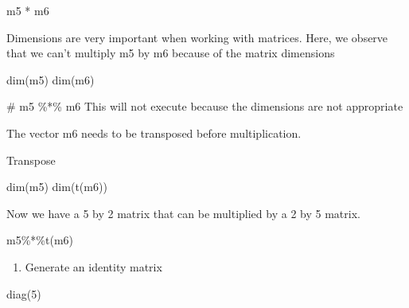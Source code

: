 \documentclass[
  letterpaper,
  DIV=11,
  numbers=noendperiod]{scrreprt}
\newenvironment{Shaded}{}{}
\newcommand{\CommentTok}[1]{\textcolor[rgb]{0.42,0.45,0.49}{#1}}
\newcommand{\DecValTok}[1]{\textcolor[rgb]{0.00,0.36,0.77}{#1}}
\newcommand{\FunctionTok}[1]{\textcolor[rgb]{0.44,0.26,0.76}{#1}}
\newcommand{\NormalTok}[1]{\textcolor[rgb]{0.14,0.16,0.18}{#1}}
\newcommand{\SpecialCharTok}[1]{\textcolor[rgb]{0.00,0.36,0.77}{#1}}
\providecommand{\tightlist}{%
  \setlength{\itemsep}{0pt}\setlength{\parskip}{0pt}}\usepackage{longtable,booktabs,array}
\begin{document}
\begin{Shaded}
\begin{Highlighting}[]
\NormalTok{m5 }\SpecialCharTok{*}\NormalTok{ m6}
\end{Highlighting}
\end{Shaded}

Dimensions are very important when working with matrices. Here, we
observe that we can't multiply m5 by m6 because of the matrix dimensions

\begin{Shaded}
\begin{Highlighting}[]
\FunctionTok{dim}\NormalTok{(m5)}
\FunctionTok{dim}\NormalTok{(m6)}
\end{Highlighting}
\end{Shaded}

\begin{Shaded}
\begin{Highlighting}[]
\CommentTok{\# m5 \%*\% m6 This will not execute because the dimensions are not appropriate}
\end{Highlighting}
\end{Shaded}

The vector m6 needs to be transposed before multiplication.

Transpose

\begin{Shaded}
\begin{Highlighting}[]
\FunctionTok{dim}\NormalTok{(m5)}
\FunctionTok{dim}\NormalTok{(}\FunctionTok{t}\NormalTok{(m6))}
\end{Highlighting}
\end{Shaded}

Now we have a 5 by 2 matrix that can be multiplied by a 2 by 5 matrix.

\begin{Shaded}
\begin{Highlighting}[]
\NormalTok{m5}\SpecialCharTok{\%*\%}\FunctionTok{t}\NormalTok{(m6)}
\end{Highlighting}
\end{Shaded}

\begin{enumerate}
\def\labelenumi{\alph{enumi}.}
\setcounter{enumi}{4}
\tightlist
\item
  Generate an identity matrix
\end{enumerate}

\begin{Shaded}
\begin{Highlighting}[]
\FunctionTok{diag}\NormalTok{(}\DecValTok{5}\NormalTok{)}
\end{Highlighting}
\end{Shaded}
\end{document}
